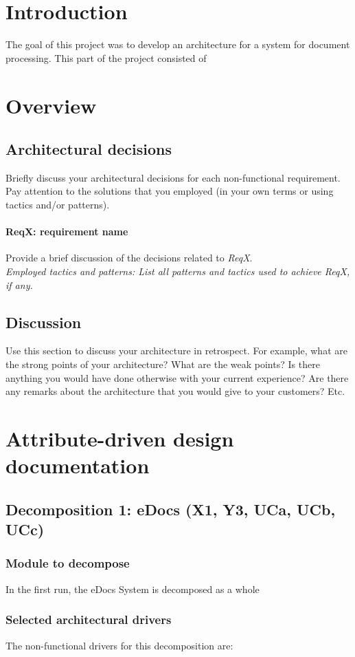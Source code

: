 \documentclass[a4paper,10pt]{article}
\begin{document}


\tableofcontents
\newpage

\section{Introduction}\label{sec:introduction}
The goal of this project was to develop  an architecture for a system for document processing. This part of the project consisted of 
\section{Overview}\label{sec:overview}
\subsection{Architectural decisions}
Briefly discuss your architectural decisions for each non-functional
requirement.
Pay attention to the solutions that you employed (in your own terms or using
tactics and/or patterns).

\paragraph{ReqX\@: requirement name} Provide a brief discussion of the
decisions related to \emph{ReqX}.\\
\emph{Employed tactics and patterns: List all patterns and tactics used to
    achieve ReqX, if any.}

\subsection{Discussion}
Use this section to discuss your architecture in retrospect.
For example, what are the strong points of your architecture?
What are the weak points? Is there anything you would have done otherwise with
your current experience?
Are there any remarks about the architecture that you would give to your
customers?
Etc.

\section{Attribute-driven design documentation}\label{sec:add}
\subsection{Decomposition 1: eDocs (X1, Y3, UCa, UCb, UCc)}
\subsubsection{Module to decompose}
In the first run, the eDocs System is decomposed as a whole\subsubsection{Selected architectural drivers}
The non-functional drivers for this decomposition are:
\end{document}
